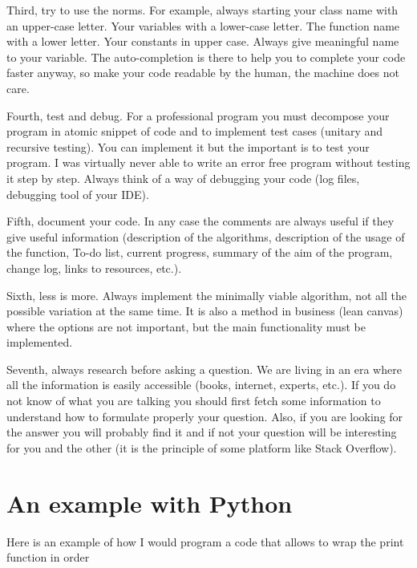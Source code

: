 \documentclass[english, 12 pt, openany, oneside]{book}
\begin{document}
Third, try to use the norms. For example, always starting your class name with an upper-case letter. Your variables with a lower-case letter. The function name with a lower letter. Your constants in upper case. Always give meaningful name to your variable. The auto-completion is there to help you to complete your code faster anyway, so make your code readable by the human, the machine does not care.

Fourth, test and debug. For a professional program you must decompose your program in atomic snippet of code and to implement test cases (unitary and recursive testing). You can implement it but the important is to test your program. I was virtually never able to write an error free program without testing it step by step. Always think of a way of debugging your code (log files, debugging tool of your IDE).

Fifth, document your code. In any case the comments are always useful if they give useful information (description of the algorithms, description of the usage of the function, To-do list, current progress, summary of the aim of the program, change log, links to resources, etc.).

Sixth, less is more. Always implement the minimally viable algorithm, not all the possible variation at the same time. It is also a method in business (lean canvas) where the options are not important, but the main functionality must be implemented.

Seventh, always research before asking a question. We are living in an era where all the information is easily accessible (books, internet, experts, etc.). If you do not know of what you are talking you should first fetch some information to understand how to formulate properly your question. Also, if you are looking for the answer you will probably find it and if not your question will be interesting for you and the other (it is the principle of some platform like Stack Overflow).

\section{An example with Python}
Here is an example of how I would program a code that allows to wrap the print function in order
\end{document}
